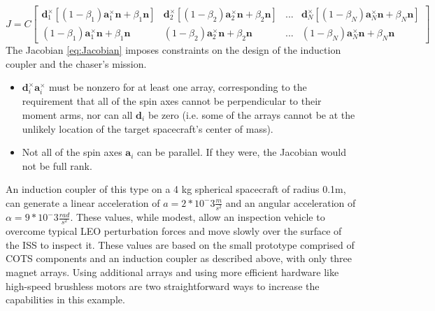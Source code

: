 \begin{equation}\label{eq:Jacobian}
J = C\begin{bmatrix} 
\boldsymbol{d}_1^{\times}\left[ \left(1-\beta_1 \right )\boldsymbol{a}_1^{\times}\boldsymbol{n} + \beta_1\boldsymbol{n}\right ]&
\boldsymbol{d}_2^{\times}\left[\left(1-\beta_2 \right )\boldsymbol{a}_2^{\times}\boldsymbol{n} + \beta_2\boldsymbol{n}\right ] &
 ... &
\boldsymbol{d}_N^{\times} \left[\left(1-\beta_N \right )\boldsymbol{a}_N^{\times}\boldsymbol{n} + \beta_N\boldsymbol{n}\right ]
\\

\left(1-\beta_1 \right )\boldsymbol{a}_1^{\times}\boldsymbol{n} + \beta_1\boldsymbol{n}&
\left(1-\beta_2 \right )\boldsymbol{a}_2^{\times}\boldsymbol{n} + \beta_2\boldsymbol{n} &
 ... &
 \left(1-\beta_N \right )\boldsymbol{a}_N^{\times}\boldsymbol{n} + \beta_N\boldsymbol{n}
\end{bmatrix}
\end{equation}
The Jacobian \ref{eq:Jacobian}  imposes constraints on the design of the induction coupler and the chaser's mission.

\begin{itemize}
\item  $\boldsymbol{d}^{\times}_i \boldsymbol{a}^{\times}_i$ must be nonzero for at least one array, corresponding to the requirement that all of the spin axes cannot be perpendicular to their moment arms, nor can all $\boldsymbol{d}_i$ be zero (i.e. some of the arrays cannot be at the unlikely location of the target spacecraft's center of mass).
\item  Not all of the spin axes $\boldsymbol{a}_i$ can be parallel. If they were, the Jacobian would not be full rank.
\end{itemize}

An induction coupler of this type on a 4 kg spherical spacecraft of radius 0.1m, can generate a linear acceleration of
$a = 2*10^-3 \frac{m}{s^2}$ 
and an angular acceleration of 
$\alpha = 9*10^-3 \frac{rad}{s^2}$. 
These values, while modest, allow an inspection vehicle to overcome typical LEO perturbation forces
 and move slowly over the surface of the ISS to inspect it. These values are based on the small prototype comprised of COTS components and an induction coupler as described above, with only three magnet arrays. Using additional arrays and using more efficient hardware like high-speed brushless motors are two straightforward ways to increase the capabilities in this example.

